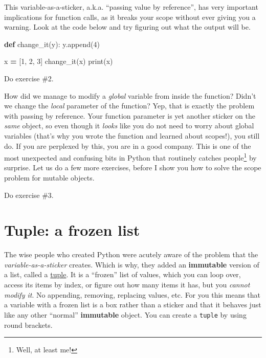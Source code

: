 \documentclass[
]{book}
\newenvironment{Shaded}{\begin{snugshade}}{\end{snugshade}}
\newcommand{\BuiltInTok}[1]{#1}
\newcommand{\DecValTok}[1]{\textcolor[rgb]{0.00,0.00,0.81}{#1}}
\newcommand{\KeywordTok}[1]{\textcolor[rgb]{0.13,0.29,0.53}{\textbf{#1}}}
\newcommand{\NormalTok}[1]{#1}
\newcommand{\OperatorTok}[1]{\textcolor[rgb]{0.81,0.36,0.00}{\textbf{#1}}}
\begin{document}
This variable-as-a-sticker, a.k.a. ``passing value by reference'', has very important implications for function calls, as it breaks your scope without ever giving you a warning. Look at the code below and try figuring out what the output will be.

\begin{Shaded}
\begin{Highlighting}[]
\KeywordTok{def}\NormalTok{ change\_it(y):}
\NormalTok{    y.append(}\DecValTok{4}\NormalTok{)}

\NormalTok{x }\OperatorTok{=}\NormalTok{ [}\DecValTok{1}\NormalTok{, }\DecValTok{2}\NormalTok{, }\DecValTok{3}\NormalTok{]}
\NormalTok{change\_it(x)}
\BuiltInTok{print}\NormalTok{(x)}
\end{Highlighting}
\end{Shaded}

Do exercise \#2.

How did we manage to modify a \emph{global} variable from inside the function? Didn't we change the \emph{local} parameter of the function? Yep, that is exactly the problem with passing by reference. Your function parameter is yet another sticker on the \emph{same} object, so even though it \emph{looks} like you do not need to worry about global variables (that's why you wrote the function and learned about scopes!), you still do. If you are perplexed by this, you are in a good company. This is one of the most unexpected and confusing bits in Python that routinely catches people\footnote{Well, at least me!} by surprise. Let us do a few more exercises, before I show you how to solve the scope problem for mutable objects.

Do exercise \#3.

\hypertarget{tuple}{%
\section{Tuple: a frozen list}\label{tuple}}

The wise people who created Python were acutely aware of the problem that the \emph{variable-as-a-sticker} creates. Which is why, they added an \textbf{immutable} version of a list, called a \href{https://docs.python.org/3/library/stdtypes.html?highlight=tuple\#tuple}{tuple}. It is a ``frozen'' list of values, which you can loop over, access its items by index, or figure out how many items it has, but you \emph{cannot modify it}. No appending, removing, replacing values, etc. For you this means that a variable with a frozen list is a box rather than a sticker and that it behaves just like any other ``normal'' \textbf{immutable} object. You can create a \texttt{tuple} by using round brackets.
\end{document}
